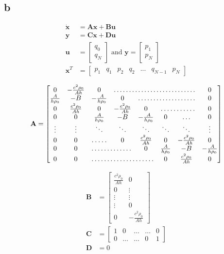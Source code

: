 \documentclass{article}
\begin{document}
\subsection{b}

\begin{align*}
    \dot{\mathbf{x}} &= \mathbf{Ax} + \mathbf{Bu}\\
    \mathbf{y} &= \mathbf{Cx} + \mathbf{Du}\\
    \mathbf{u} &= \begin{bmatrix}
        q_0\\q_N
    \end{bmatrix} \text{ and } 
    \mathbf{y} = \begin{bmatrix}
        p_1\\p_N
    \end{bmatrix}\\
    \mathbf{x}^T &= \begin{bmatrix}
        p_1 & q_1 & p_2 & q_2 & ... & q_{N-1} & p_N
    \end{bmatrix}
\end{align*}


\begin{equation*}
    \mathbf{A} = \begin{bmatrix}
        0 & -\frac{c^2\rho_0}{Ah} & 0 & \hdotsfor{4} & 0\\
        \frac{A}{h\rho_0} & -B & -\frac{A}{h\rho_0} & 0 & \hdotsfor{3} & 0\\
        0 & \frac{c^2\rho_0}{Ah} & 0 & -\frac{c^2\rho_0}{Ah} &  0 & \hdotsfor{2} & 0\\
        0 & 0 & \frac{A}{h\rho_0} & -B & -\frac{A}{h\rho_0} & 0 & \hdots & 0\\
        \vdots & \vdots & \ddots & \ddots & \ddots & \ddots & \ddots & \vdots \\
        0 & 0 &  \hdotsfor{1} & 0 & \frac{c^2\rho_0}{Ah} & 0 & -\frac{c^2\rho_0}{Ah}& 0\\
        0 & 0 & \hdotsfor{2} & 0 & \frac{A}{h\rho_0} & -B & -\frac{A}{h\rho_0}\\
        0 & 0 & \hdotsfor{3} & 0 & \frac{c^2\rho_0}{Ah}& 0
    \end{bmatrix}
\end{equation*}

\begin{align*}
    \mathbf{B} &= \begin{bmatrix}
        \frac{c^2\rho_0}{Ah} & 0\\
        0 & \vdots\\
        \vdots & \vdots\\
        \vdots & 0 \\
        0 & -\frac{c^2\rho_0}{Ah}
    \end{bmatrix}\\
    \mathbf{C} &= \begin{bmatrix}
        1 & 0 & \hdots & \hdots & 0\\
        0 & \hdots & \hdots & 0 & 1
    \end{bmatrix}\\
    \mathbf{D} &= 0
\end{align*}
\end{document}
